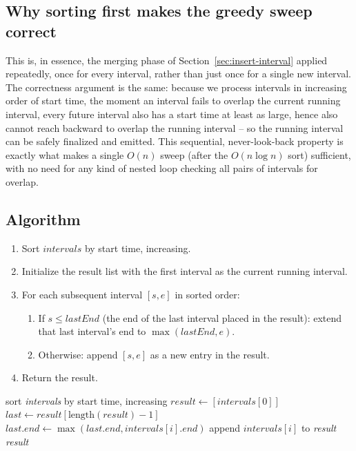 \subsection*{Why sorting first makes the greedy sweep correct}

This is, in essence, the merging phase of Section~\ref{sec:insert-interval}
applied repeatedly, once for every interval, rather than just once for a
single new interval. The correctness argument is the same: because we
process intervals in increasing order of start time, the moment an interval
fails to overlap the current running interval, every future interval also
has a start time at least as large, hence also cannot reach backward to
overlap the running interval -- so the running interval can be safely
finalized and emitted. This sequential, never-look-back property is exactly
what makes a single $O(n)$ sweep (after the $O(n \log n)$ sort) sufficient,
with no need for any kind of nested loop checking all pairs of intervals
for overlap.

\subsection*{Algorithm}

\begin{enumerate}
  \item Sort $\textit{intervals}$ by start time, increasing.
  \item Initialize the result list with the first interval as the current
        running interval.
  \item For each subsequent interval $[\textit{s}, \textit{e}]$ in sorted
        order:
  \begin{enumerate}
    \item If $s \le \textit{lastEnd}$ (the end of the last interval placed
          in the result): extend that last interval's end to
          $\max(\textit{lastEnd}, e)$.
    \item Otherwise: append $[s, e]$ as a new entry in the result.
  \end{enumerate}
  \item Return the result.
\end{enumerate}

\begin{algorithm}[H]
\caption{Merge Intervals}
\begin{algorithmic}[1]
  \State sort \textit{intervals} by start time, increasing
  \State $\textit{result} \gets [\textit{intervals}[0]]$
    \State $\textit{last} \gets \textit{result}[\text{length}(\textit{result})-1]$
      \State $\textit{last}.\textit{end} \gets \max(\textit{last}.\textit{end}, \textit{intervals}[i].\textit{end})$
    \Else
      \State append $\textit{intervals}[i]$ to \textit{result}
    \EndIf
  \EndFor
  \State \Return \textit{result}
\EndProcedure
\end{algorithmic}
\end{algorithm}

